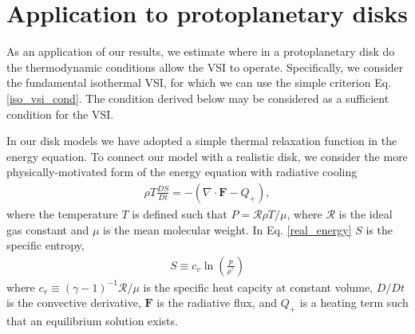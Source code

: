 \section{Application to protoplanetary disks}\label{application} 
As an application of our results, we estimate where in a 
protoplanetary disk do the thermodynamic conditions allow the VSI to 
operate. Specifically, we consider the fundamental isothermal VSI, 
for which we can use the simple criterion Eq. \ref{iso_vsi_cond}. The
condition derived below may be considered as a sufficient condition for the VSI.  

In our disk models we have adopted a simple thermal relaxation
function in the energy equation. To connect our model with a realistic
disk, we consider the more physically-motivated form of the energy
equation with radiative cooling 
\begin{align}\label{real_energy}
\rho T \frac{DS}{Dt} = - \left(\nabla\cdot\bm{F} - Q_+\right), 
\end{align}
where the temperature $T$ is defined such that $P=\mathcal{R}\rho
T/\mu$, where $\mathcal{R}$ is the ideal gas constant and $\mu$ is
the mean molecular weight. In Eq. \ref{real_energy} $S$ is the
specific entropy,
\begin{align}
  S \equiv c_v\ln{\left(\frac{p}{\rho^{\gamma}}\right)} 
\end{align}
where $c_v \equiv \left(\gamma-1\right)^{-1}\mathcal{R}/\mu$ is the specific heat capcity at
constant volume, $D/Dt$ is the convective derivative, $\bm{F}$ is the
radiative flux, and $Q_+$ is a heating term such that an equilibrium
solution exists.  

